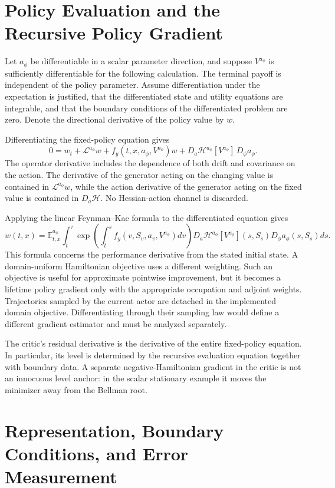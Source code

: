 \documentclass[ecta,draft]{econsocart}
\theoremstyle{definition}
\theoremstyle{remark}
\newcommand{\E}{\mathbb E}
\newcommand{\HH}{\mathcal H}
\newcommand{\LL}{\mathcal L}
\begin{document}
\section{Policy Evaluation and the Recursive Policy Gradient}
Let $a_\phi$ be differentiable in a scalar parameter direction, and suppose $V^{a_\phi}$ is sufficiently differentiable for the following calculation. The terminal payoff is independent of the policy parameter. Assume differentiation under the expectation is justified, that the differentiated state and utility equations are integrable, and that the boundary conditions of the differentiated problem are zero. Denote the directional derivative of the policy value by $w$.

Differentiating the fixed-policy equation gives
\[
 0=w_t+\LL^{a_\phi}w+f_y(t,x,a_\phi,V^{a_\phi})w
  +D_a\HH^{a_\phi}[V^{a_\phi}]\,D_\phi a_\phi.
\]
The operator derivative includes the dependence of both drift and covariance on the action. The derivative of the generator acting on the changing value is contained in $\LL^{a_\phi}w$, while the action derivative of the generator acting on the fixed value is contained in $D_a\HH$. No Hessian-action channel is discarded.

Applying the linear Feynman--Kac formula to the differentiated equation gives
\[
 w(t,x)=\E_{t,x}^{a_\phi}\int_t^\tau
 \exp\left(\int_t^s f_y(v,S_v,a_v,V^{a_\phi})dv\right)
 D_a\HH^{a_\phi}[V^{a_\phi}](s,S_s)D_\phi a_\phi(s,S_s)ds.
\]
This formula concerns the performance derivative from the stated initial state. A domain-uniform Hamiltonian objective uses a different weighting. Such an objective is useful for approximate pointwise improvement, but it becomes a lifetime policy gradient only with the appropriate occupation and adjoint weights. Trajectories sampled by the current actor are detached in the implemented domain objective. Differentiating through their sampling law would define a different gradient estimator and must be analyzed separately.

The critic's residual derivative is the derivative of the entire fixed-policy equation. In particular, its level is determined by the recursive evaluation equation together with boundary data. A separate negative-Hamiltonian gradient in the critic is not an innocuous level anchor: in the scalar stationary example it moves the minimizer away from the Bellman root.

\section{Representation, Boundary Conditions, and Error Measurement}
\end{document}

